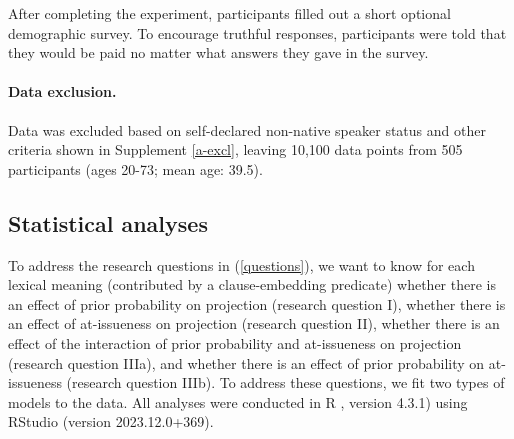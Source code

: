 \documentclass[11pt,fleqn]{article}
\newcommand{\6}{\mbox{$[\hspace*{-.6mm}[$}}
\newcommand{\9}{\mbox{$]\hspace*{-.6mm}]$}}
\begin{document}
After completing the experiment, participants filled out a short optional demographic survey. To encourage truthful responses, participants were told that they would be paid no matter what answers they gave in the survey.

\paragraph{Data exclusion.} Data was excluded based on self-declared non-native speaker status and other criteria shown in Supplement \ref{a-excl}, leaving 10,100 data points from 505 participants (ages 20-73; mean age: 39.5).

\subsection{Statistical analyses}\label{s:stats1}

To address the research questions in (\ref{questions}), we want to know for each lexical meaning (contributed by a clause-embedding predicate) whether there is an effect of prior probability on projection (research question I), whether there is an effect of at-issueness on projection (research question II), whether there is an effect of the interaction of prior probability and at-issueness on projection (research question IIIa), and whether there is an effect of prior probability on at-issueness (research question IIIb). To address these questions, we fit two types of models to the data. All analyses were conducted in R \citep{R}, version 4.3.1) using RStudio (version 2023.12.0+369).
\end{document}
